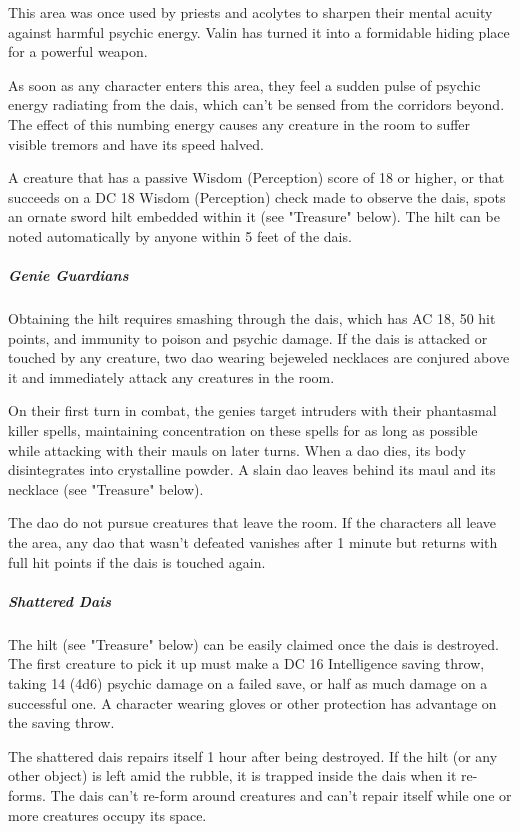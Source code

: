 \documentclass[10pt,a4paper,twoside,bg=print,twocolumn,openany,nodeprecatedcode]{dndbook}
\begin{document}
This area was once used by priests and acolytes to sharpen their mental acuity against harmful psychic energy. Valin has turned it into a formidable hiding place for a powerful weapon.

As soon as any character enters this area, they feel a sudden pulse of psychic energy radiating from the dais, which can't be sensed from the corridors beyond. The effect of this numbing energy causes any creature in the room to suffer visible tremors and have its speed halved.

A creature that has a passive Wisdom (Perception) score of 18 or higher, or that succeeds on a DC 18 Wisdom (Perception) check made to observe the dais, spots an ornate sword hilt embedded within it (see "Treasure" below). The hilt can be noted automatically by anyone within 5 feet of the dais.

\subparagraph{Genie Guardians}
Obtaining the hilt requires smashing through the dais, which has AC 18, 50 hit points, and immunity to poison and psychic damage. If the dais is attacked or touched by any creature, two dao wearing bejeweled necklaces are conjured above it and immediately attack any creatures in the room.

On their first turn in combat, the genies target intruders with their phantasmal killer spells, maintaining concentration on these spells for as long as possible while attacking with their mauls on later turns. When a dao dies, its body disintegrates into crystalline powder. A slain dao leaves behind its maul and its necklace (see "Treasure" below).

The dao do not pursue creatures that leave the room. If the characters all leave the area, any dao that wasn't defeated vanishes after 1 minute but returns with full hit points if the dais is touched again.

\subparagraph{Shattered Dais}
The hilt (see "Treasure" below) can be easily claimed once the dais is destroyed. The first creature to pick it up must make a DC 16 Intelligence saving throw, taking 14 (4d6) psychic damage on a failed save, or half as much damage on a successful one. A character wearing gloves or other protection has advantage on the saving throw.

The shattered dais repairs itself 1 hour after being destroyed. If the hilt (or any other object) is left amid the rubble, it is trapped inside the dais when it re-forms. The dais can't re-form around creatures and can't repair itself while one or more creatures occupy its space.
\end{document}
